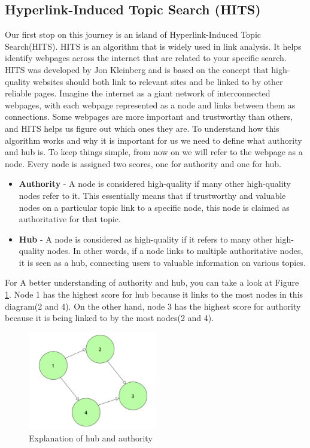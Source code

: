 \documentclass[10pt,english,a4paper]{article}
\begin{document}
\subsection{Hyperlink-Induced Topic Search (HITS)}\label{hits}
Our first stop on this journey is an island of Hyperlink-Induced Topic Search(HITS). HITS is an algorithm that is widely used in link analysis. It helps identify webpages across the internet that are related to your specific search. HITS was developed by Jon Kleinberg and is based on the concept that high-quality websites should both link to relevant sites and be linked to by other reliable pages. Imagine the internet as a giant network of interconnected webpages, with each webpage represented as a node and links between them as connections. Some webpages are more important and trustworthy than others, and HITS helps us figure out which ones they are. To understand how this algorithm works and why it is important for us we need to define what authority and hub is. To keep things simple, from now on we will refer to the webpage as a node. Every node is assigned two scores, one for authority and one for hub.
\begin{itemize}
	\item \textbf{Authority} - A node is considered high-quality if many other high-quality nodes refer to it. This essentially means that if trustworthy and valuable nodes on a particular topic link to a specific node, this node is claimed as authoritative for that topic.
	\item \textbf{Hub} - A node is considered as high-quality if it refers to many other high-quality nodes. In other words, if a node links to multiple authoritative nodes, it is seen as a hub, connecting users to valuable information on various topics.
\end{itemize}
For A better understanding of authority and hub, you can take a look at Figure \ref{explanationHITS}. Node 1 has the highest score for hub because it links to the most nodes in this diagram(2 and 4). On the other hand, node 3 has the highest score for authority because it is being linked to by the most nodes(2 and 4).
\begin{figure}
  \centering
  \includegraphics[width=0.5\textwidth]{explanation_HITS.png}
  \caption{Explanation of hub and authority}
  \label{explanationHITS}
\end{figure}
\end{document}
